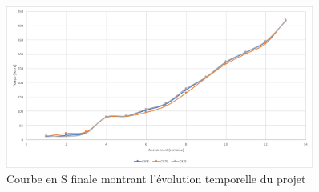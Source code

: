 	\begin{figure}[H]
		\centering
		\includegraphics[width=0.9\textwidth]{Pictures/Gestion/courbeS}
		\caption{Courbe en S finale montrant l'évolution temporelle du projet}
		\label{fig.courbeS}
	\end{figure}



